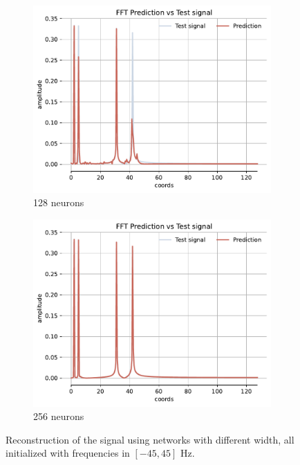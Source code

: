 \begin{figure}[h!]
\begin{subfigure}[b]{0.32\textwidth}
        \centering
        \includegraphics[width=\textwidth]{img/ch3/fft_w45all_hf128.pdf}
        \caption{128 neurons}
        \label{fig:fft-128-full-45}
    \end{subfigure}
    \begin{subfigure}[b]{0.32\textwidth}
        \centering
        \includegraphics[width=\textwidth]{img/ch3/fft_w45all_hf256.pdf}
        \caption{256 neurons}
        \label{fig:fft-256-full-45}
    \end{subfigure}
    \label{fig:all-freqs-reconstruction}
    \caption{Reconstruction of the signal using networks with different width, all initialized with frequencies in $[-45, 45]$ Hz.}
\end{figure}


